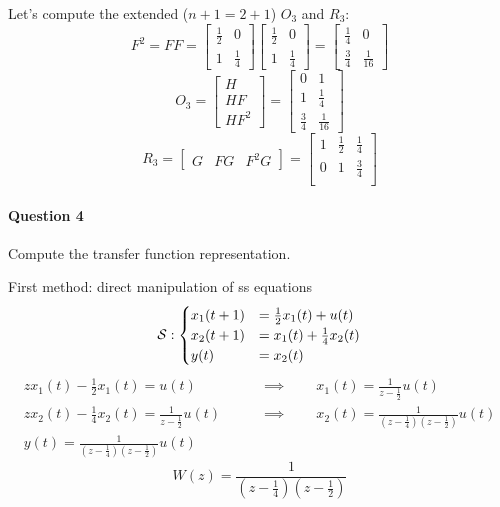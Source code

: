 \begin{exa}
    Let's compute the extended ($n+1 = 2+1$) $O_3$ and $R_3$:
    \[
        F^{2} = F F = 
        \begin{bmatrix}
            \frac{1}{2} & 0 \\
            1 & \frac{1}{4} 
        \end{bmatrix} 
        \begin{bmatrix}
            \frac{1}{2} & 0 \\
            1 & \frac{1}{4} 
        \end{bmatrix} = 
        \begin{bmatrix}
            \frac{1}{4} & 0 \\
            \frac{3}{4} & \frac{1}{16} 
        \end{bmatrix}
    \]
    \[
        O_3 = \begin{bmatrix}
            H \\ HF \\ HF^2
        \end{bmatrix} = \begin{bmatrix}
            0 & 1 \\
            1 & \frac{1}{4} \\
            \frac{3}{4} & \frac{1}{16}
        \end{bmatrix}
    \]
    \[
        R_3 = \begin{bmatrix}
            G & FG & F^2G
        \end{bmatrix} = \begin{bmatrix}
            1 & \frac{1}{2} & \frac{1}{4} \\
            0 & 1 & \frac{3}{4} \\
        \end{bmatrix}
    \]

    \paragraph{Question 4} Compute the transfer function representation.

    First method: direct manipulation of \gls{ss} equations
    \[
        \mathcal{S}:
        \begin{cases}
            x_1(t+1) &= \frac{1}{2}x_1(t) + u(t) \\
            x_2(t+1) &= x_1(t) + \frac{1}{4}x_2(t) \\
            y(t) &= x_2(t)
        \end{cases}
    \]
    \begin{align*}
        zx_1(t) - \frac{1}{2}x_1(t) = u(t) \qquad &\implies \qquad x_1(t) = \frac{1}{z-\frac{1}{2}}u(t) \\
        zx_2(t) - \frac{1}{4}x_2(t) = \frac{1}{z-\frac{1}{2}}u(t) \qquad &\implies \qquad x_2(t) = \frac{1}{(z-\frac{1}{4})(z-\frac{1}{2})}u(t) \\
        y(t) = \frac{1}{(z-\frac{1}{4})(z-\frac{1}{2})}u(t)
    \end{align*}
    \[
        W(z) = \frac{1}{(z-\frac{1}{4})(z-\frac{1}{2})}
    \]


\end{exa}

